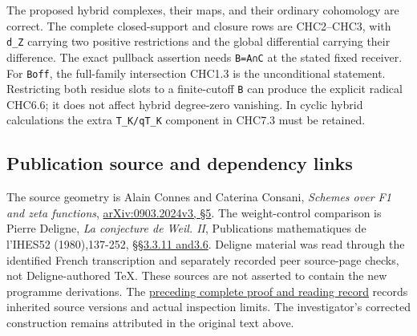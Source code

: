 The proposed hybrid complexes, their maps, and their ordinary cohomology
are correct. The complete closed-support and closure rows are
CHC2--CHC3, with \texttt{d\_Z} carrying two positive restrictions and
the global differential carrying their difference. The exact pullback
assertion needs \texttt{B=A∩C} at the stated fixed receiver. For
\texttt{Boff}, the full-family intersection CHC1.3 is the unconditional
statement. Restricting both residue slots to a finite-cutoff \texttt{B}
can produce the explicit radical CHC6.6; it does not affect hybrid
degree-zero vanishing. In cyclic hybrid calculations the extra
\texttt{T\_K/qT\_K} component in CHC7.3 must be retained.

\subsection{Publication source and dependency
links}\label{publication-source-and-dependency-links}

The source geometry is Alain Connes and Caterina Consani, \emph{Schemes
over F1 and zeta functions},
\href{https://arxiv.org/abs/0903.2024v3}{arXiv:0903.2024v3, §5}. The
weight-control comparison is Pierre Deligne, \emph{La conjecture de
Weil. II}, Publications mathematiques de l'IHES52 (1980),137-252,
\href{https://www.numdam.org/item/PMIHES_1980__52__137_0/}{§§3.3.11
and3.6}. Deligne material was read through the identified French
transcription and separately recorded peer source-page checks, not
Deligne-authored TeX. These sources are not asserted to contain the new
programme derivations. The
\href{https://github.com/KokunoYumeto/zeta-function-research-reader/blob/36a82ecca98addb8a98b48204e349737856c7223/workbenches/splitzero-tandem/continuations/20260924-cohomology-weight-and-character-lifts/BUILD_AND_REVIEW.md}{preceding
complete proof and reading record} records inherited source versions and
actual inspection limits. The investigator's corrected construction
remains attributed in the original text above.
